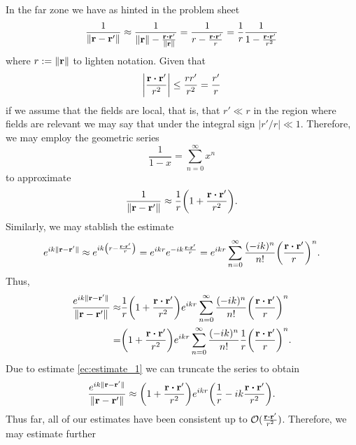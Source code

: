 \documentclass{article}
\begin{document}
\begin{enumerate}[(i)]
In the far zone we have as hinted in the problem sheet
\begin{equation}
\frac{
1}{\|\vb{r}-\vb{r}'\|}\approx\frac{
1}{\|\vb{r}\|-\frac{\vb{r}\vdot\vb{r}'}{\|\vb{r}\|}}=\frac{
1}{r-\frac{\vb{r}\vdot\vb{r}'}{r}}=\frac{1}{r}\frac{1}{1-\frac{\vb{r}\vdot\vb{r}'}{r^2}}
\end{equation}
where $r:=\|\vb{r}\|$ to lighten notation. Given that
\begin{equation}\label{ec:estimate_1}
\left|\frac{\vb{r}\vdot\vb{r}'}{r^2}\right|\leq\frac{rr'}{r^2}=\frac{r'}{r}
\end{equation}
if we assume that the fields are local, that is, that $r'\ll r$ in the region where fields are relevant we may say that under the integral sign $|r'/r|\ll 1$. Therefore, we may employ the geometric series
\begin{equation}
\frac{1}{1-x}=\sum_{n=0}^\infty x^n
\end{equation}
to approximate
\begin{equation}
\frac{
1}{\|\vb{r}-\vb{r}'\|}\approx\frac{1}{r}\qty(1+\frac{\vb{r}\vdot\vb{r}'}{r^2}).
\end{equation}
Similarly, we may stablish the estimate
\begin{equation}
e^{ik\|\vb{r}-\vb{r}'\|}\approx e^{ik\qty(r-\frac{\vb{r}\vdot\vb{r}'}{r})}=e^{ikr}e^{-ik\frac{\vb{r}\vdot\vb{r}'}{r}}=e^{ikr}\sum_{n=0}^\infty\frac{(-ik)^n}{n!}\qty(\frac{\vb{r}\vdot\vb{r}'}{r})^n.
\end{equation}
Thus,
\begin{align}
\begin{split}
\frac{
e^{ik\|\vb{r}-\vb{r}'\|}}{\|\vb{r}-\vb{r}'\|}\approx&\frac{1}{r}\qty(1+\frac{\vb{r}\vdot\vb{r}'}{r^2})e^{ikr}\sum_{n=0}^\infty\frac{(-ik)^n}{n!}\qty(\frac{\vb{r}\vdot\vb{r}'}{r})^n\\
=&\qty(1+\frac{\vb{r}\vdot\vb{r}'}{r^2})e^{ikr}\sum_{n=0}^\infty\frac{(-ik)^n}{n!}\frac{1}{r}\qty(\frac{\vb{r}\vdot\vb{r}'}{r})^n.
\end{split}
\end{align}
Due to estimate \eqref{ec:estimate_1} we can truncate the series to obtain
\begin{equation}
\frac{
e^{ik\|\vb{r}-\vb{r}'\|}}{\|\vb{r}-\vb{r}'\|}\approx\qty(1+\frac{\vb{r}\vdot\vb{r}'}{r^2})e^{ikr}\qty(\frac{1}{r}-ik\frac{\vb{r}\vdot\vb{r}'}{r^2}).
\end{equation}
Thus far, all of our estimates have been consistent up to $\mathcal{O}(\frac{\vb{r}\vdot\vb{r}'}{r^2})$. Therefore, we may estimate further

\end{enumerate}
\end{document}
